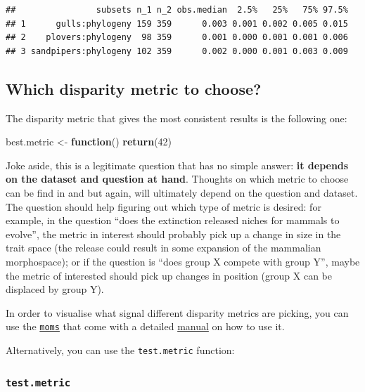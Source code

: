 \documentclass[
]{book}
\newenvironment{Shaded}{\begin{snugshade}}{\end{snugshade}}
\newcommand{\ControlFlowTok}[1]{\textcolor[rgb]{0.13,0.29,0.53}{\textbf{#1}}}
\newcommand{\DecValTok}[1]{\textcolor[rgb]{0.00,0.00,0.81}{#1}}
\newcommand{\KeywordTok}[1]{\textcolor[rgb]{0.13,0.29,0.53}{\textbf{#1}}}
\newcommand{\NormalTok}[1]{#1}
\newcommand{\StringTok}[1]{\textcolor[rgb]{0.31,0.60,0.02}{#1}}
\begin{document}
\begin{verbatim}
##                subsets n_1 n_2 obs.median  2.5%   25%   75% 97.5%
## 1      gulls:phylogeny 159 359      0.003 0.001 0.002 0.005 0.015
## 2    plovers:phylogeny  98 359      0.001 0.000 0.001 0.001 0.006
## 3 sandpipers:phylogeny 102 359      0.002 0.000 0.001 0.003 0.009
\end{verbatim}

\hypertarget{which-disparity-metric-to-choose}{%
\subsection{Which disparity metric to choose?}\label{which-disparity-metric-to-choose}}

The disparity metric that gives the most consistent results is the following one:

\begin{Shaded}
\begin{Highlighting}[]
\NormalTok{best.metric \textless{}{-}}\StringTok{ }\ControlFlowTok{function}\NormalTok{() }\KeywordTok{return}\NormalTok{(}\DecValTok{42}\NormalTok{)}
\end{Highlighting}
\end{Shaded}

Joke aside, this is a legitimate question that has no simple answer: \textbf{it depends on the dataset and question at hand}.
Thoughts on which metric to choose can be find in \citet{moms} and \citet{Guillerme2020} but again, will ultimately depend on the question and dataset.
The question should help figuring out which type of metric is desired: for example, in the question ``does the extinction released niches for mammals to evolve'', the metric in interest should probably pick up a change in size in the trait space (the release could result in some expansion of the mammalian morphospace); or if the question is ``does group X compete with group Y'', maybe the metric of interested should pick up changes in position (group X can be displaced by group Y).

In order to visualise what signal different disparity metrics are picking, you can use the \href{https://tguillerme.shinyapps.io/moms/}{\texttt{moms}} that come with a detailed \href{https://rawcdn.githack.com/TGuillerme/moms/master/inst/moms_vignette.html}{manual} on how to use it.

Alternatively, you can use the \texttt{test.metric} function:

\hypertarget{test-metric}{%
\subsubsection{\texorpdfstring{\texttt{test.metric}}{test.metric}}\label{test-metric}}
\end{document}
